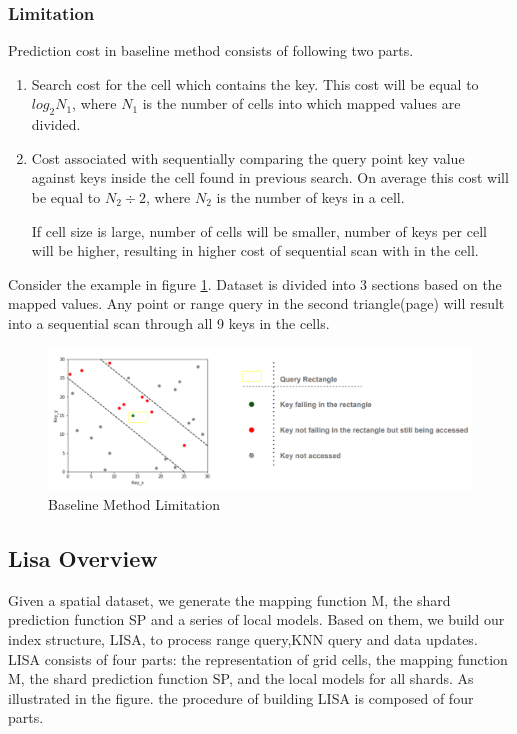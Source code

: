 \subsubsection{Limitation}

Prediction cost in baseline method consists of following two parts.

\begin{enumerate}
	\item Search cost for the cell which contains the key. This cost will be equal to $log_{2}N_{1}$, where $N_{1}$ is the number of cells into which mapped values are divided.
	
	\item Cost associated with sequentially comparing the query point key value against keys inside the cell found in previous search. On average this cost will be equal to $N_{2}\div2$, where $N_{2}$ is the number of keys in a cell.   
	
If cell size is large, number of cells will be smaller, number of keys per cell will be higher, resulting in higher cost of sequential scan with in the cell. 
\end{enumerate}
Consider the example in figure \ref{fig:BaseLine_Method_Limitation}. Dataset is divided into 3 sections based on the mapped values. Any point or range query in the second triangle(page) will result into a sequential scan through all 9 keys in the cells.   

\begin{figure}[t]
    \centering
    \includegraphics[width=1\textwidth]{graphs/Lisa_Baseline_Model_Limitation.png}
    \caption{Baseline Method Limitation }
    \label{fig:BaseLine_Method_Limitation}
\end{figure}

\subsection{Lisa Overview}

Given a spatial dataset, we generate the mapping function
M, the shard prediction function SP and a series of local
models. Based on them, we build our index structure, LISA, to
process range query,KNN query and data updates. LISA consists of four parts: the representation of grid cells, the mapping function M, the shard prediction function SP, and the local models for all shards. As illustrated in the figure. the procedure of building LISA is composed of four parts.

